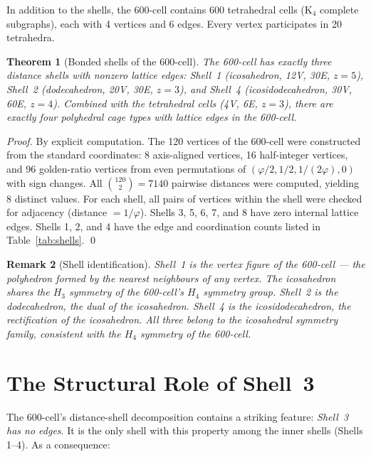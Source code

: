 \documentclass[11pt,letterpaper]{article}
\newtheorem{theorem}{Theorem}[section]
\newtheorem{remark}[theorem]{Remark}
\newcommand{\phig}{\varphi}
\begin{document}
In addition to the shells, the 600-cell contains 600 tetrahedral
cells (K$_4$ complete subgraphs), each with 4 vertices and 6 edges.
Every vertex participates in 20 tetrahedra.

\begin{theorem}[Bonded shells of the 600-cell]
\label{thm:shells}
The 600-cell has exactly three distance shells with nonzero lattice
edges: Shell~1 (icosahedron, 12V, 30E, $z=5$), Shell~2
(dodecahedron, 20V, 30E, $z=3$), and Shell~4 (icosidodecahedron,
30V, 60E, $z=4$).  Combined with the tetrahedral cells (4V, 6E,
$z=3$), there are exactly four polyhedral cage types with lattice
edges in the 600-cell.
\end{theorem}

\begin{proof}
By explicit computation.  The 120 vertices of the 600-cell were
constructed from the standard coordinates: 8 axis-aligned vertices,
16 half-integer vertices, and 96 golden-ratio vertices from even
permutations of $(\phig/2, 1/2, 1/(2\phig), 0)$ with sign changes.
All $\binom{120}{2} = 7140$ pairwise distances were computed,
yielding 8 distinct values.  For each shell, all pairs of vertices
within the shell were checked for adjacency (distance $= 1/\phig$).
Shells 3, 5, 6, 7, and 8 have zero internal lattice edges.
Shells 1, 2, and 4 have the edge and coordination counts listed in
Table~\ref{tab:shells}. \qed
\end{proof}

\begin{remark}[Shell identification]
Shell~1 is the vertex figure of the 600-cell --- the polyhedron
formed by the nearest neighbours of any vertex.  The icosahedron
shares the $H_3$ symmetry of the 600-cell's $H_4$ symmetry group.
Shell~2 is the dodecahedron, the dual of the icosahedron.  Shell~4
is the icosidodecahedron, the rectification of the icosahedron.
All three belong to the icosahedral symmetry family, consistent
with the $H_4$ symmetry of the 600-cell.
\end{remark}

\section{The Structural Role of Shell~3}
\label{sec:shell3}

The 600-cell's distance-shell decomposition contains a striking
feature: \emph{Shell~3 has no edges}.  It is the only shell with
this property among the inner shells (Shells 1--4).  As a
consequence:
\end{document}
